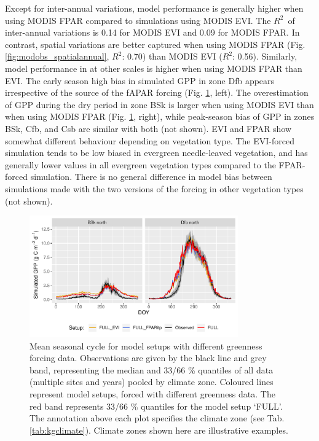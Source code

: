 \documentclass{myreport}
\newcommand{\rsq}{$R^2$}
\begin{document}
Except for inter-annual variations, model performance is generally higher when using MODIS FPAR compared to simulations using MODIS EVI. The \rsq\ of inter-annual variations is 0.14 for MODIS EVI and 0.09 for MODIS FPAR. In contrast, spatial variations are better captured when using MODIS FPAR (Fig. \ref{fig:modobs_spatialannual}, \rsq : 0.70) than MODIS EVI (\rsq : 0.56). Similarly, model performance in at other scales is higher when using MODIS FPAR than EVI. The early season high bias in simulated GPP in zone Dfb appears irrespective of the source of the fAPAR forcing (Fig. \ref{fig:season_greenness}, left). The overestimation of GPP during the dry period in zone BSk is larger when using MODIS EVI than when using MODIS FPAR (Fig. \ref{fig:season_greenness}, right), while peak-season bias of GPP in zones BSk, Cfb, and Csb are similar with both (not shown). EVI and FPAR show somewhat different behaviour depending on vegetation type. The EVI-forced simulation tends to be low biased in evergreen needle-leaved vegetation, and has generally lower values in all evergreen vegetation types compared to the FPAR-forced simulation. There is no general difference in model bias between simulations made with the two versions of the forcing in other vegetation types (not shown). 

 \begin{figure}[!ht]
    \centering
\includegraphics[width=0.8\textwidth]{fig/meandoy_byzone_greenness.pdf}
    \caption{Mean seasonal cycle for model setups with different greenness forcing data. Observations are given by the black line and grey band, representing the median and 33/66 \% quantiles of all data (multiple sites and years) pooled by climate zone. Coloured lines represent model setups, forced with different greenness data. The red band represents 33/66 \% quantiles for the model setup `FULL'. The annotation above each plot specifies the climate zone (see Tab. \ref{tab:kgclimate}). Climate zones shown here are illustrative examples.}
    \label{fig:season_greenness}
\end{figure}
\end{document}
